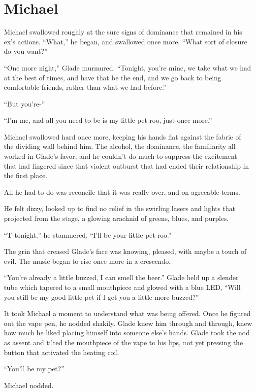 \chapter{Michael}

Michael swallowed roughly at the sure signs of dominance that remained in his ex's actions.  ``What,'' he began, and swallowed once more.  ``What sort of closure do you want?''

``One more night,'' Glade murmured.  ``Tonight, you're mine, we take what we had at the best of times, and have that be the end, and we go back to being comfortable friends, rather than what we had before.''

``But you're-''

``I'm me, and all you need to be is my little pet roo, just once more.''

Michael swallowed hard once more, keeping his hands flat against the fabric of the dividing wall behind him.  The alcohol, the dominance, the familiarity all worked in Glade's favor, and he couldn't do much to suppress the excitement that had lingered since that violent outburst that had ended their relationship in the first place.

All he had to do was reconcile that it was really over, and on agreeable terms.

He felt dizzy, looked up to find no relief in the swirling lasers and lights that projected from the stage, a glowing arachnid of greens, blues, and purples.

``T-tonight,'' he stammered, ``I'll be your little pet roo.''

The grin that creased Glade's face was knowing, pleased, with maybe a touch of evil.  The music began to rise once more in a crescendo.

``You're already a little buzzed, I can smell the beer.''  Glade held up a slender tube which tapered to a small mouthpiece and glowed with a blue LED, ``Will you still be my good little pet if I get you a little more buzzed?''

It took Michael a moment to understand what was being offered.  Once he figured out the vape pen, he nodded shakily.  Glade knew him through and through, knew how much he liked placing himself into someone else's hands.  Glade took the nod as assent and tilted the mouthpiece of the vape to his lips, not yet pressing the button that activated the heating coil.

``You'll be my pet?''

Michael nodded.

